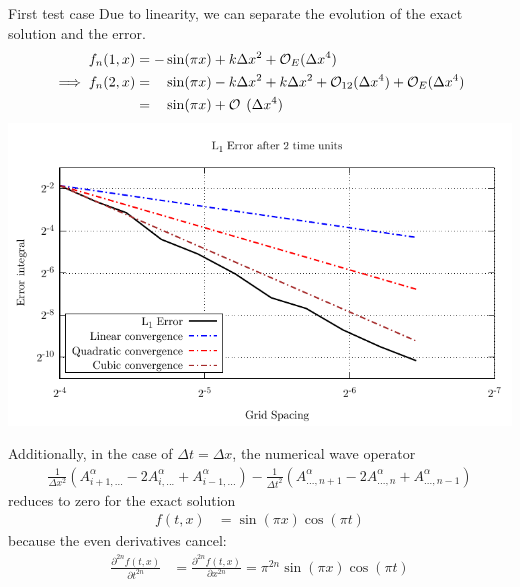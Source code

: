 \documentclass[5pt]{beamer}
\begin{document}
\begin{frame}
  {\huge First test case}
  Due to linearity, we can separate the evolution of the exact solution and the error.
  \begin{align*}
  f_n(1, x) &= -\sin(\pi x) + k\Delta x^2 + \mathcal{O}_E(\Delta x^4) \\
  \implies f_n(2, x) &= \hphantom{-} \sin(\pi x) - k\Delta x^2 + k\Delta x^2 + \mathcal{O}_{12}(\Delta x^4) + \mathcal{O}_E(\Delta x^4) \\
                     &= \hphantom{-} \sin(\pi x) + \mathcal{O}_{\hphantom{1}}(\Delta x^4) 
  \end{align*}
  \pause
  \includegraphics[width=\textwidth]{wave_error_cubic.pdf}
\end{frame}
\begin{frame}
  Additionally, in the case of $\Delta t = \Delta x$, the numerical wave operator
  \begin{align*}
  \frac{1}{\Delta x^2}\left(A^\alpha_{i+1,...} - 2 A^\alpha_{i,...} + A^\alpha_{i-1,...}\right) - \frac{1}{\Delta t^2}\left(A^\alpha_{...,n+1} - 2 A^\alpha_{...,n} + A^\alpha_{...,n-1}\right)
  \end{align*}
  reduces to zero for the exact solution
  \begin{align*}
    f(t, x) &= \sin(\pi x)\cos(\pi t)
  \end{align*}
  \pause
  because the even derivatives cancel:
  \begin{align*}
    \frac{\partial ^ {2n}f(t, x)}{\partial t^{2n}} &= \frac{\partial ^ {2n}f(t, x)}{\partial x^{2n}} = \pi ^ {2n}\sin(\pi x)\cos(\pi t)
  \end{align*}
\end{frame}
\end{document}
